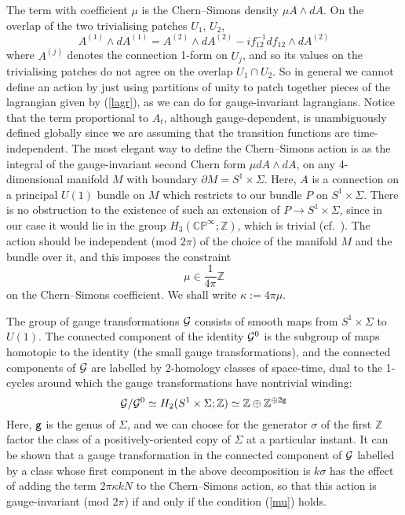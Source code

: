 \documentclass[a4paper,11pt]{article}
\begin{document}
The term with coefficient $\mu$ is the Chern--Simons
density $\mu A\wedge dA$. On the overlap of the two trivialising
patches $U_{1}$, $U_{2}$,
\[
A^{(1)}\wedge dA^{(1)} =
A^{(2)}\wedge dA^{(2)} -if_{12}^{-1}df_{12}\wedge dA^{(2)}
\]
where $A^{(j)}$ denotes the connection 1-form on $U_{j}$,
and so its values on the trivialising patches do not agree on the
overlap $U_{1}\cap U_{2}$. 
So in general we cannot define an action by just using partitions of 
unity to patch together pieces of the lagrangian given by
(\ref{lagr}), as we can do for gauge-invariant lagrangians. 
Notice that the term proportional to $A_{t}$, although gauge-dependent, 
is unambiguously defined globally since we are assuming that the transition 
functions are time-independent.
The most elegant way to define the Chern--Simons action is as the 
integral of the gauge-invariant second Chern form $\mu dA\wedge dA$, on any
4-dimensional manifold $M$ with boundary
$\partial {M} = S^{1}\times \Sigma$. 
Here, $A$ is a connection on a principal $U(1)$ bundle on ${M}$
which restricts to our bundle $P$ on $S^{1}\times \Sigma$.
There is no obstruction to the existence of such an extension
of $P\rightarrow S^{1}\times \Sigma$, since in our case it
would lie in the group $H_{3}(\mathbb{CP}^{\infty};\mathbb{Z})$,
which is trivial (cf.~\cite{DW}). The action should be independent 
(mod $2\pi$) of the choice of the manifold ${M}$ and the bundle over it, 
and this imposes the constraint
\begin{equation} \label{mu}
\mu\in \frac{1}{4 \pi} \mathbb{Z}
\end{equation}
on the Chern--Simons coefficient. We shall write $\kappa:=4\pi \mu$.


The group of gauge transformations ${\cal G}$ consists of smooth maps 
from $S^{1}\times \Sigma$ to $U(1)$. The connected component of the 
identity ${\cal G}^{0}$ is the subgroup of maps homotopic to the
identity (the small gauge transformations), and the connected
components of ${\cal G}$ are labelled
by 2-homology classes of space-time, dual to the 1-cycles around which
the gauge transformations have nontrivial winding:
\begin{equation}\label{ccompts}
{\cal G}/{\cal G}^{0}\simeq H_{2}(S^{1}\times \Sigma; \mathbb{Z})
\simeq \mathbb{Z} \oplus \mathbb{Z}^{\oplus 2 {\tt g}}
\end{equation}
Here, ${\tt g}$ is the genus of $\Sigma$, and we can choose for the 
generator ${\sigma}$ of the first $\mathbb{Z}$ factor the class of a
positively-oriented copy of $\Sigma$ at a particular instant. It can
be shown \cite{DGS}
that a gauge transformation in the connected component of ${\cal G}$
labelled by a class whose first component in the above decomposition
is $k\sigma$ has the effect of adding the term $2\pi\kappa k N$ to
the Chern--Simons action, so that this action is gauge-invariant 
(mod $2\pi$) if and only if the condition (\ref{mu}) holds.
\end{document}
